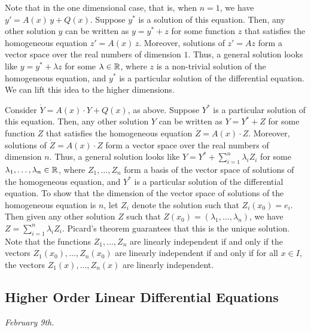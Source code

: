 Note that in the one dimensional case, that is, when $n=1$, we have $y' = A(x) \, y + Q(x)$. Suppose $y^{\ast}$ is a solution of this equation. Then, any other solution $y$ can be written as $y = y^{\ast} + z$ for some function $z$ that satisfies the homogeneous equation $z' = A(x) \, z$. Moreover, solutions of $z' = Az$ form a vector space over the real numbers of dimension $1$. Thus, a general solution looks like $y = y^{\ast} + \lambda z$ for some $\lambda \in \mathbb{R}$, where $z$ is a non-trivial solution of the homogeneous equation, and $y^{\ast}$ is a particular solution of the differential equation. We can lift this idea to the higher dimensions.

Consider $\dot{Y} = A(x) \cdot Y + Q(x)$, as above. Suppose $Y^{\ast}$ is a particular solution of this equation. Then, any other solution $Y$ can be written as $Y = Y^{\ast} + Z$ for some function $Z$ that satisfies the homogeneous equation $\dot{Z} = A(x) \cdot Z$. Moreover, solutions of $\dot{Z} = A(x) \cdot Z$ form a vector space over the real numbers of dimension $n$. Thus, a general solution looks like $Y = Y^{\ast} + \sum_{i=1}^{n} \lambda_{i} Z_{i}$ for some $\lambda_{1}, \ldots, \lambda_{n} \in \mathbb{R}$, where $Z_{1}, \ldots, Z_{n}$ form a basis of the vector space of solutions of the homogeneous equation, and $Y^{\ast}$ is a particular solution of the differential equation. To show that the dimension of the vector space of solutions of the homogeneous equation is $n$, let $Z_{i}$ denote the solution such that $Z_{i}(x_{0}) = e_{i}$. Then given any other solution $Z$ such that $Z(x_{0}) = (\lambda_{1},\ldots,\lambda_{n})$, we have $Z = \sum_{i=1}^{n} \lambda_{i} Z_{i}$. Picard's theorem guarantees that this is the unique solution. Note that the functions $Z_{1}, \ldots, Z_{n}$ are linearly independent if and only if the vectors $Z_{1}(x_{0}),\ldots,Z_{n}(x_{0})$ are linearly independent if and only if for all $x \in I$, the vectors $Z_{1}(x),\ldots,Z_{n}(x)$ are linearly independent.

\subsection{Higher Order Linear Differential Equations}
\textit{February 9th.}

